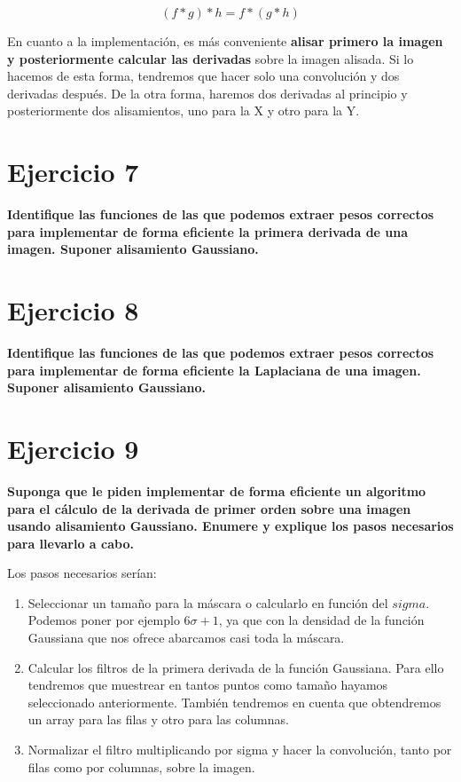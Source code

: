 \documentclass[11pt,a4paper]{article}
\begin{document}
\begin{equation}
(f*g)*h=f*(g*h)
\end{equation}

En cuanto a la implementación, es más conveniente \textbf{alisar primero la imagen y posteriormente calcular las derivadas} sobre
la imagen alisada. Si lo hacemos de esta forma, tendremos que hacer solo una convolución y dos derivadas después. De la otra forma,
haremos dos derivadas al principio y posteriormente dos alisamientos, uno para la X y otro para la Y.


\section*{Ejercicio 7}

\textbf{Identifique las funciones de las que podemos extraer pesos correctos para implementar de forma eficiente la primera derivada de
una imagen. Suponer alisamiento Gaussiano.}




\section*{Ejercicio 8}

\textbf{Identifique las funciones de las que podemos extraer pesos correctos para implementar de forma eficiente la Laplaciana de una imagen.
Suponer alisamiento Gaussiano.}


\section*{Ejercicio 9}

\textbf{Suponga que le piden implementar de forma eficiente un algoritmo para el cálculo de la derivada de primer orden sobre una imagen
usando alisamiento Gaussiano. Enumere y explique los pasos necesarios para llevarlo a cabo.}

Los pasos necesarios serían:
\begin{enumerate}
	\item Seleccionar un tamaño para la máscara o calcularlo en función del $sigma$. Podemos poner por ejemplo $6\sigma+1$, ya que con la
	densidad de la función Gaussiana que nos ofrece abarcamos casi toda la máscara.
	\item Calcular los filtros de la primera derivada de la función Gaussiana. Para ello tendremos que muestrear en tantos puntos como
	tamaño hayamos seleccionado anteriormente. También tendremos en cuenta que obtendremos un array para las filas y otro para las columnas.
	\item Normalizar el filtro multiplicando por sigma y hacer la convolución, tanto por filas como por columnas, sobre la imagen.
\end{enumerate}
\end{document}
